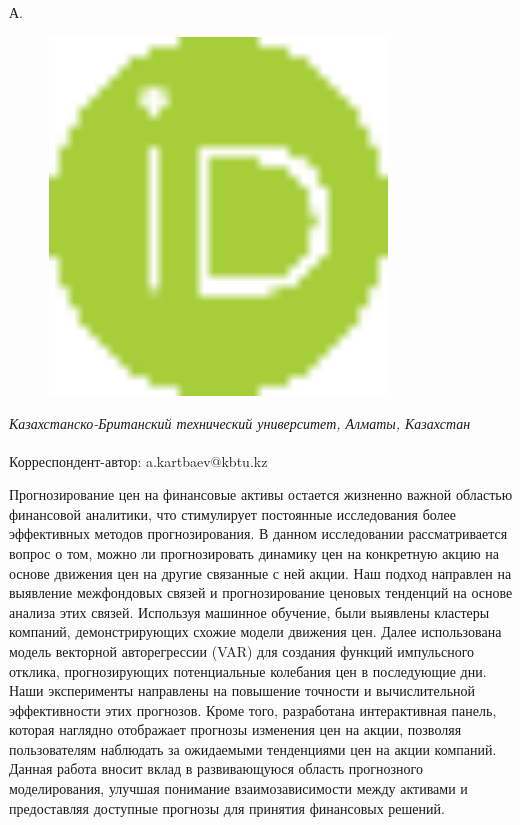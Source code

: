 {А.
\begin{figure}[H]
	\centering
	\includegraphics[width=0.8\textwidth]{media/ict2/image1}
	\caption*{}
\end{figure}


\emph{Казахстанско-Британский технический университет, Алматы,
Казахстан}

{\bfseries \textsuperscript{\envelope }}Корреспондент-автор: a.kartbaev@kbtu.kz

Прогнозирование цен на финансовые активы остается жизненно важной
областью финансовой аналитики, что стимулирует постоянные исследования
более эффективных методов прогнозирования. В данном исследовании
рассматривается вопрос о том, можно ли прогнозировать динамику цен на
конкретную акцию на основе движения цен на другие связанные с ней акции.
Наш подход направлен на выявление межфондовых связей и прогнозирование
ценовых тенденций на основе анализа этих связей. Используя машинное
обучение, были выявлены кластеры компаний, демонстрирующих схожие модели
движения цен. Далее использована модель векторной авторегрессии (VAR)
для создания функций импульсного отклика, прогнозирующих потенциальные
колебания цен в последующие дни. Наши эксперименты направлены на
повышение точности и вычислительной эффективности этих прогнозов. Кроме
того, разработана интерактивная панель, которая наглядно отображает
прогнозы изменения цен на акции, позволяя пользователям наблюдать за
ожидаемыми тенденциями цен на акции компаний. Данная работа вносит вклад
в развивающуюся область прогнозного моделирования, улучшая понимание
взаимозависимости между активами и предоставляя доступные прогнозы для
принятия финансовых решений.

}
